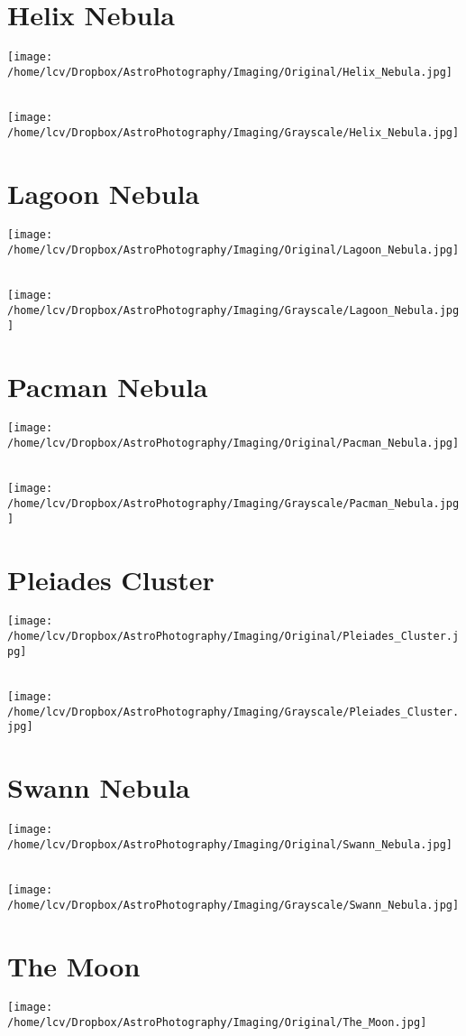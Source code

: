 \section{Helix Nebula}
\texttt{[image: /home/lcv/Dropbox/AstroPhotography/Imaging/Original/Helix\_Nebula.jpg]}
{\footnotesize\color{white}

}\ \\
\texttt{[image: /home/lcv/Dropbox/AstroPhotography/Imaging/Grayscale/Helix\_Nebula.jpg]}
\section{Lagoon Nebula}
\texttt{[image: /home/lcv/Dropbox/AstroPhotography/Imaging/Original/Lagoon\_Nebula.jpg]}
{\footnotesize\color{white}

}\ \\
\texttt{[image: /home/lcv/Dropbox/AstroPhotography/Imaging/Grayscale/Lagoon\_Nebula.jpg]}
\section{Pacman Nebula}
\texttt{[image: /home/lcv/Dropbox/AstroPhotography/Imaging/Original/Pacman\_Nebula.jpg]}
{\footnotesize\color{white}

}\ \\
\texttt{[image: /home/lcv/Dropbox/AstroPhotography/Imaging/Grayscale/Pacman\_Nebula.jpg]}
\section{Pleiades Cluster}
\texttt{[image: /home/lcv/Dropbox/AstroPhotography/Imaging/Original/Pleiades\_Cluster.jpg]}
{\footnotesize\color{white}

}\ \\
\texttt{[image: /home/lcv/Dropbox/AstroPhotography/Imaging/Grayscale/Pleiades\_Cluster.jpg]}
\section{Swann Nebula}
\texttt{[image: /home/lcv/Dropbox/AstroPhotography/Imaging/Original/Swann\_Nebula.jpg]}
{\footnotesize\color{white}

}\ \\
\texttt{[image: /home/lcv/Dropbox/AstroPhotography/Imaging/Grayscale/Swann\_Nebula.jpg]}
\section{The Moon}
\texttt{[image: /home/lcv/Dropbox/AstroPhotography/Imaging/Original/The\_Moon.jpg]}
{\footnotesize\color{white}

}\ \\
